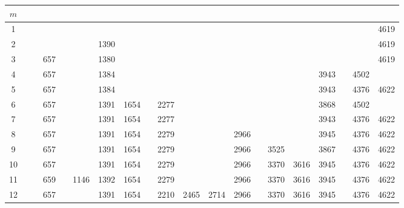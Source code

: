     \begin{landscape}
        \pagestyle{empty}
        \begin{table}
            \centering
            \begin{tabular}{|c|ccccccccccccccccccc|}\hline
                $m$  &      &     &     &     &      &      &      &      &      &      &      &      &      &      &      &      &      &      &      \\\hline
                1  &      &     &     &     &      &      &      &      &      &      &      &      &      &      &      &      &      &      & 4619 \\
                2  &      &     &     &     &      & 1390 &      &      &      &      &      &      &      &      &      &      &      &      & 4619 \\
                3  &      &     & 657 &     &      & 1380 &      &      &      &      &      &      &      &      &      &      &      &      & 4619 \\
                4  &      &     & 657 &     &      & 1384 &      &      &      &      &      &      &      &      &      & 3943 &      & 4502 &      \\
                5  &      &     & 657 &     &      & 1384 &      &      &      &      &      &      &      &      &      & 3943 &      & 4376 & 4622 \\
                6  &      &     & 657 &     &      & 1391 & 1654 &      & 2277 &      &      &      &      &      &      & 3868 &      & 4502 &      \\
                7  &      &     & 657 &     &      & 1391 & 1654 &      & 2277 &      &      &      &      &      &      & 3943 &      & 4376 & 4622 \\
                8  &      &     & 657 &     &      & 1391 & 1654 &      & 2279 &      &      & 2966 &      &      &      & 3945 &      & 4376 & 4622 \\
                9  &      &     & 657 &     &      & 1391 & 1654 &      & 2279 &      &      & 2966 &      & 3525 &      & 3867 &      & 4376 & 4622 \\
                10 &      &     & 657 &     &      & 1391 & 1654 &      & 2279 &      &      & 2966 &      & 3370 & 3616 & 3945 &      & 4376 & 4622 \\
                11 &      &     & 659 &     & 1146 & 1392 & 1654 &      & 2279 &      &      & 2966 &      & 3370 & 3616 & 3945 &      & 4376 & 4622 \\
                12 &      &     & 657 &     &      & 1391 & 1654 &      & 2210 & 2465 & 2714 & 2966 &      & 3370 & 3616 & 3945 &      & 4376 & 4622 \\

\end{tabular}
\end{table}
\end{landscape}
